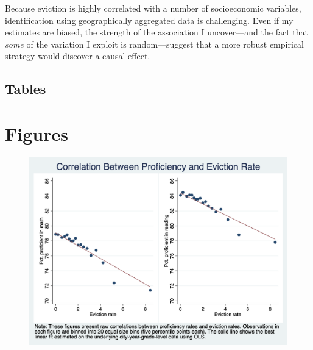 \documentclass[12pt]{article}
\begin{document}
Because eviction is highly correlated with a number of socioeconomic variables, identification using geographically aggregated data is challenging. Even if my estimates are biased, the strength of the association I uncover—and the fact that \textit{some} of the variation I exploit is random—suggest that a more robust empirical strategy would discover a causal effect.




\singlespacing
\setlength\bibsep{0pt}





\clearpage

\onehalfspacing


\begin{landscape}
\section*{Tables} \label{sec:tab}

\end{landscape}




\newpage
{}
\begin{landscape}

\end{landscape}
\restoregeometry

\begin{landscape}


\end{landscape}
\restoregeometry

\clearpage

\section*{Figures} \label{sec:fig}

\begin{figure}[H]
    \centering
    \includegraphics[scale=0.4]{output/graphs/outcome_binscatter.png}
    \caption{}
    \label{fig:my_label}
\end{figure}
\end{document}
